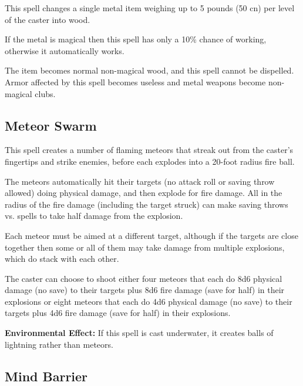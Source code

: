 \begin{multicols*}{2}
This spell changes a single metal item weighing up to 5 pounds (50 cn) per level of the caster into wood.

If the metal is magical then this spell has only a 10\% chance of working, otherwise it automatically works.

The item becomes normal non-magical wood, and this spell cannot be dispelled. Armor affected by this spell becomes useless and metal weapons become non-magical clubs.

\subsection{Meteor Swarm}\label{spell:Meteor Swarm}

This spell creates a number of flaming meteors that streak out from the caster’s fingertips and strike enemies, before each explodes into a 20-foot radius fire ball.

The meteors automatically hit their targets (no attack roll or saving throw allowed) doing physical damage, and then explode for fire damage. All in the radius of the fire damage (including the target struck) can make saving throws vs. spells to take half damage from the explosion.

Each meteor must be aimed at a different target, although if the targets are close together then some or all of them may take damage from multiple explosions, which do stack with each other.

The caster can choose to shoot either four meteors that each do 8d6 physical damage (no save) to their targets plus 8d6 fire damage (save for half) in their explosions or eight meteors that each do 4d6 physical damage (no save) to their targets plus 4d6 fire damage (save for half) in their explosions.

\textbf{Environmental Effect:} If this spell is cast underwater, it creates balls of lightning rather than meteors.

\subsection{Mind Barrier}\label{spell:Mind Barrier}
\end{multicols*}
